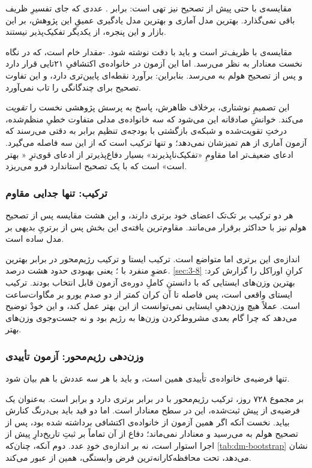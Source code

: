 مقایسه‌ی  با  حتی پیش از تصحیح نیز تهی است:
 برابر . عددی که جای تفسیرِ ظریف باقی نمی‌گذارد. بهترین مدل آماری و بهترین
مدل یادگیری عمیقِ این پژوهش، بر این بازار و این پنجره، از یکدیگر تفکیک‌پذیر نیستند.

مقایسه‌ی  با  ظریف‌تر است و باید با دقت نوشته شود.
-مقدار خام  است، که در نگاه نخست معنادار به نظر می‌رسد. اما این
آزمون در خانواده‌ی اکتشافیِ ۲۱تایی قرار دارد و پس از تصحیح هولم به 
می‌رسد. بنابراین:  برآورد نقطه‌ای پایین‌تری دارد، و این تفاوت تصحیح برای
چندگانگی را تاب نمی‌آورد.

این تصمیمِ نوشتاری، برخلاف ظاهرش، پاسخ به پرسش پژوهشی نخست را \emph{تقویت} می‌کند.
خوانشِ صادقانه این می‌شود که سه خانواده‌ی مدلی متفاوت  خطیِ منظم‌شده، درختِ
تقویت‌شده و شبکه‌ی بازگشتی  با بودجه‌ی تنظیم برابر به دقتی می‌رسند که آزمون
آماری از هم تمیزشان نمی‌دهد؛ و تنها ترکیب است که از این سه فاصله می‌گیرد. ادعای
ضعیف‌تر اما مقاومِ «تفکیک‌ناپذیرند» بسیار دفاع‌پذیرتر از ادعای قوی‌ترِ «
بهتر است» است که با یک تصحیح استاندارد فرو می‌ریزد.

\subsubsection*{ترکیب: تنها جدایی مقاوم}

هر دو ترکیب بر تک‌تک اعضای خود برتری دارند، و این هشت مقایسه پس از تصحیح هولم نیز
با  حداکثر  برقرار می‌مانند. مقاوم‌ترین یافته‌ی این بخش پس از
برتریِ بدیهی بر مدل ساده است.

اندازه‌ی این برتری اما متواضع است. ترکیب ایستا  و ترکیب رژیم‌محور
 در برابر بهترین عضوِ منفرد با ؛ یعنی بهبودی حدود هشت درصد.
\cref{sec:3-8} کرانِ اوراکل را  گزارش کرد: بهترین وزن‌های ایستایی که با
دانستنِ کاملِ دوره‌ی آزمون قابل انتخاب بودند. ترکیب ایستای واقعی  است، پس
فاصله تا آن کران کمتر از دو صدم یورو بر مگاوات‌ساعت است. عملاً هیچ وزن‌دهیِ ایستایی
نمی‌توانست از این بهتر عمل کند، و این خودْ توضیح می‌دهد که چرا گام بعدی مشروط‌کردن
وزن‌ها به رژیم بود و نه جست‌وجوی وزن‌های بهتر.

\subsubsection*{وزن‌دهی رژیم‌محور: آزمون تأییدی}

تنها فرضیه‌ی خانواده‌ی تأییدی همین است، و باید با هر سه عددش با هم بیان شود.

بر مجموع ۷۲۸ روز، ترکیب رژیم‌محور با  در برابر  برتری دارد و
 برابر  است. به‌عنوان یک فرضیه‌ی از پیش ثبت‌شده، این در سطح
 معنادار است. اما دو قید باید بی‌درنگ کنارش بیاید. نخست آنکه اگر همین آزمون
از خانواده‌ی اکتشافی برداشته شده بود، پس از تصحیح هولم به  می‌رسید و
معنادار نمی‌ماند؛ دفاع از آن تماماً بر ثبتِ تاریخ‌دارِ پیش از اجرا استوار است، نه بر
اندازه‌ی خودِ عدد. دوم آنکه، چنان‌که \cref{tab:dm-bootstrap} نشان می‌دهد، تحت
محافظه‌کارانه‌ترین فرض وابستگی، همین  از  عبور می‌کند.

